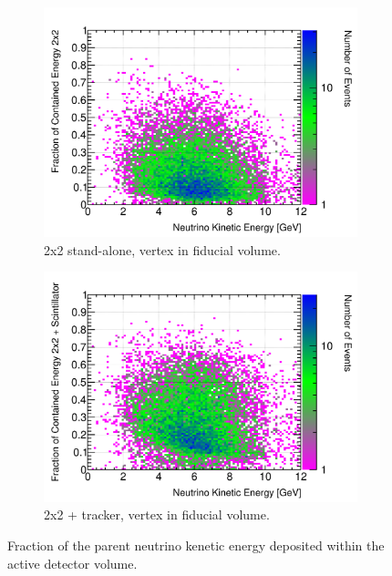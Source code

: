 \documentclass[10pt,a4paper,openany]{article}
\begin{document}
\begin{figure}[htbp]
\begin{subfigure}[b]{0.49\textwidth}
	\end{subfigure}	
	\begin{subfigure}[b]{0.49\textwidth}
		\centering
    \includegraphics[width=1.0\textwidth]{E_contained_frac_2x2_fiducial.png}
		\caption{2x2 stand-alone, vertex in fiducial volume.}
		\label{}
	\end{subfigure}	
	\hfill
	\begin{subfigure}[b]{0.49\textwidth}
		\centering
		\includegraphics[width=1.0\textwidth]{E_contained_frac_2x2_Scintillator_fiducial_gap.png}
		\caption{2x2 + tracker, vertex in fiducial volume.}
		\label{}
	\end{subfigure}
  \caption{Fraction of the parent neutrino kenetic energy deposited within the active detector volume.}
\end{figure}
\end{document}
